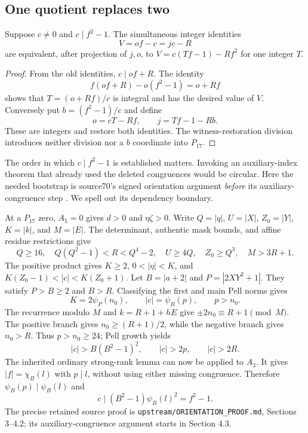 \subsection{One quotient replaces two}

\begin{lemma}\label{lem:integer-quotient}
Suppose $c\ne0$ and $c\mid f^2-1$. The simultaneous integer identities
\[
 V=of-c=jc-R
\]
are equivalent, after projection of $j,o$, to
$V=c(Tf-1)-Rf^2$ for one integer $T$.
\end{lemma}
\begin{proof}
From the old identities, $c\mid of+R$. The identity
\[
 f(of+R)-o(f^2-1)=o+Rf
\]
shows that $T=(o+Rf)/c$ is integral and has the desired value of $V$.
Conversely put $b=(f^2-1)/c$ and define
\[
 o=cT-Rf,\qquad j=Tf-1-Rb.
\]
These are integers and restore both identities. The witness-restoration
division introduces neither division nor a $b$ coordinate into $P_{17}$.
\end{proof}

The order in which $c\mid f^2-1$ is established matters. Invoking an
auxiliary-index theorem that already used the deleted congruences would
be circular. Here the needed bootstrap is source70's signed orientation
argument \emph{before} its auxiliary-congruence step
\cite{source70}. We spell out its dependency boundary.

At a $P_{17}$ zero, $A_5=0$ gives $d>0$ and $\eta\zeta>0$.
Write $Q=|q|$, $U=|X|$, $Z_0=|Y|$, $K=|k|$, and $M=|E|$.
The determinant, authentic mask bounds, and affine residue restrictions give
\[
 Q\ge16,\quad Q(Q^2-1)<R<Q^4-2,\quad
 U\ge4Q,\quad Z_0\ge Q^3,\quad M>3R+1.
\]
The positive product gives $K\ge2$, $0<|\eta|<K$, and
$K(Z_0-1)<|c|<K(Z_0+1)$. Let $B=|a+2|$ and $P=|2XY^2+1|$.
They satisfy $P>B\ge2$ and $B>R$. Classifying the first and main
Pell norms gives
\[
 K=2\psi_P(n_0),\qquad |c|=\psi_B(p),\qquad p>n_0.
\]
The recurrence modulo $M$ and $k=R+1+hE$ give
$\pm2n_0\equiv R+1\pmod M$. The positive branch gives
$n_0\ge(R+1)/2$, while the negative branch gives $n_0>R$.
Thus $p>n_0\ge24$; Pell growth yields
\[
 |c|>B(B^2-1)^2,\qquad |c|>2p,\qquad |c|>2R.
\]
The inherited ordinary strong-rank lemma can now be applied to $A_3$.
It gives $|f|=\chi_B(l)$ with $p\mid l$, without using either missing
congruence. Therefore $\psi_B(p)\mid\psi_B(l)$ and
\[
 c\mid (B^2-1)\psi_B(l)^2=f^2-1.
\]
The precise retained source proof is
\texttt{upstream/ORIENTATION\_PROOF.md}, Sections 3--4.2; its
auxiliary-congruence argument starts in Section 4.3.

